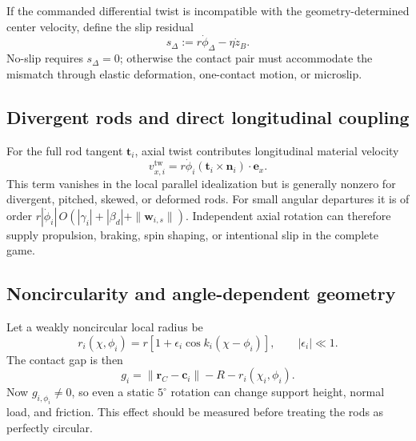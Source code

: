 \documentclass[11pt]{article}
\numberwithin{equation}{section}
\theoremstyle{definition}
\theoremstyle{remark}
\begin{document}
If the commanded differential twist is incompatible with the geometry-determined center velocity, define the slip residual
\begin{equation}
  s_\Delta:=r\dot\phi_\Delta-\eta\dot z_B.
  \label{eq:differentialslip}
\end{equation}
No-slip requires $s_\Delta=0$; otherwise the contact pair must accommodate the mismatch through elastic deformation, one-contact motion, or microslip.

\subsection{Divergent rods and direct longitudinal coupling}

For the full rod tangent $\bm t_i$, axial twist contributes longitudinal material velocity
\begin{equation}
  v^{\mathrm{tw}}_{x,i}
  =r\dot\phi_i
  (\bm t_i\times\bm n_i)\cdot\bm e_x.
  \label{eq:twistlongitudinalcoupling}
\end{equation}
This term vanishes in the local parallel idealization but is generally nonzero for divergent, pitched, skewed, or deformed rods.  For small angular departures it is of order $r|\dot\phi_i|\,O(|\gamma_i|+|\beta_d|+\|\bm w_{i,s}\|)$.  Independent axial rotation can therefore supply propulsion, braking, spin shaping, or intentional slip in the complete game.

\subsection{Noncircularity and angle-dependent geometry}

Let a weakly noncircular local radius be
\begin{equation}
  r_i(\chi,\phi_i)
  =r\left[1+\epsilon_i\cos k_i(\chi-\phi_i)\right],
  \qquad |\epsilon_i|\ll1.
  \label{eq:noncircularradius}
\end{equation}
The contact gap is then
\begin{equation}
  g_i
  =\|\bm r_C-\bm c_i\|-R-r_i(\chi_i,\phi_i).
  \label{eq:noncirculargap}
\end{equation}
Now $g_{i,\phi_i}\neq0$, so even a static $5^\circ$ rotation can change support height, normal load, and friction.  This effect should be measured before treating the rods as perfectly circular.
\end{document}
